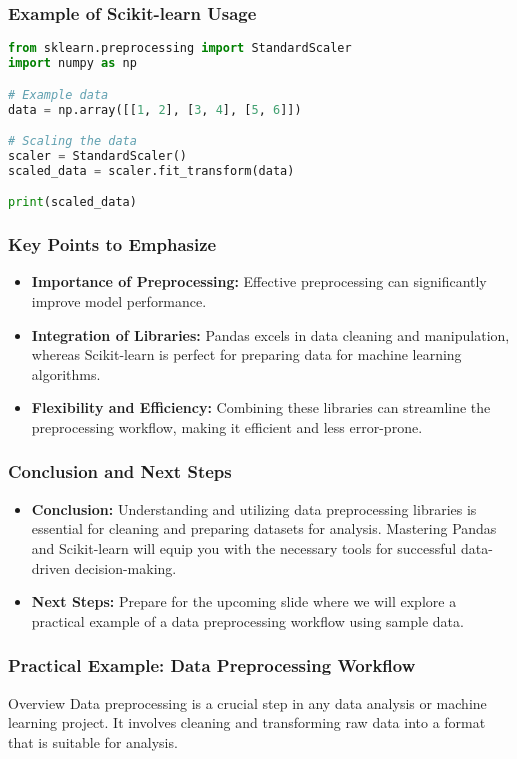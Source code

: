 \documentclass[aspectratio=169]{beamer}
\begin{document}
\begin{frame}[fragile]
    \frametitle{Example of Scikit-learn Usage}
    \begin{lstlisting}[language=Python]
from sklearn.preprocessing import StandardScaler
import numpy as np

# Example data
data = np.array([[1, 2], [3, 4], [5, 6]])

# Scaling the data
scaler = StandardScaler()
scaled_data = scaler.fit_transform(data)

print(scaled_data)
    \end{lstlisting}
\end{frame}

\begin{frame}
    \frametitle{Key Points to Emphasize}
    \begin{itemize}
        \item \textbf{Importance of Preprocessing:} Effective preprocessing can significantly improve model performance.
        \item \textbf{Integration of Libraries:} Pandas excels in data cleaning and manipulation, whereas Scikit-learn is perfect for preparing data for machine learning algorithms.
        \item \textbf{Flexibility and Efficiency:} Combining these libraries can streamline the preprocessing workflow, making it efficient and less error-prone.
    \end{itemize}
\end{frame}

\begin{frame}
    \frametitle{Conclusion and Next Steps}
    \begin{itemize}
        \item \textbf{Conclusion:} Understanding and utilizing data preprocessing libraries is essential for cleaning and preparing datasets for analysis. Mastering Pandas and Scikit-learn will equip you with the necessary tools for successful data-driven decision-making.
        \item \textbf{Next Steps:} Prepare for the upcoming slide where we will explore a practical example of a data preprocessing workflow using sample data.
    \end{itemize}
\end{frame}

\begin{frame}[fragile]
    \frametitle{Practical Example: Data Preprocessing Workflow}
    \begin{block}{Overview}
        Data preprocessing is a crucial step in any data analysis or machine learning project. It involves cleaning and transforming raw data into a format that is suitable for analysis. 
    \end{block}
\end{frame}
\end{document}
